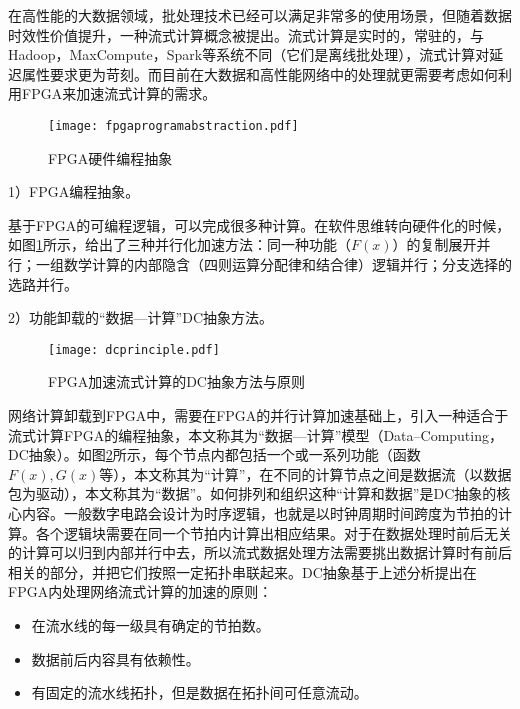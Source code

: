 
在高性能的大数据领域，批处理技术已经可以满足非常多的使用场景，但随着数据时效性价值提升，一种流式计算概念被提出。流式计算是实时的，常驻的，与Hadoop，MaxCompute，Spark等系统不同（它们是离线批处理），流式计算对延迟属性要求更为苛刻。而目前在大数据和高性能网络中的处理就更需要考虑如何利用FPGA来加速流式计算的需求。
\begin{figure}[!ht]
	\centering
	\texttt{[image: fpgaprogramabstraction.pdf]}
	\caption{FPGA硬件编程抽象} \label{fig:fpgaprogramabstraction}
\end{figure}

1）FPGA编程抽象。
		
基于FPGA的可编程逻辑，可以完成很多种计算。在软件思维转向硬件化的时候，如图\ref{fig:fpgaprogramabstraction}所示，给出了三种并行化加速方法：同一种功能（$F(x)$）的复制展开并行；一组数学计算的内部隐含（四则运算分配律和结合律）逻辑并行；分支选择的选路并行。



2）功能卸载的“数据---计算”DC抽象方法。

\begin{figure}[!ht]
	\centering
	\texttt{[image: dcprinciple.pdf]}
	\caption{FPGA加速流式计算的DC抽象方法与原则} \label{fig:dcprinciple}
\end{figure}

网络计算卸载到FPGA中，需要在FPGA的并行计算加速基础上，引入一种适合于流式计算FPGA的编程抽象，本文称其为“数据---计算”模型（Data--Computing，DC抽象）。如图\ref{fig:dcprinciple}所示，每个节点内都包括一个或一系列功能（函数$F(x), G(x)$等），本文称其为“计算”，在不同的计算节点之间是数据流（以数据包为驱动），本文称其为“数据”。如何排列和组织这种“计算和数据”是DC抽象的核心内容。一般数字电路会设计为时序逻辑，也就是以时钟周期时间跨度为节拍的计算。各个逻辑块需要在同一个节拍内计算出相应结果。对于在数据处理时前后无关的计算可以归到内部并行中去，所以流式数据处理方法需要挑出数据计算时有前后相关的部分，并把它们按照一定拓扑串联起来。DC抽象基于上述分析提出在FPGA内处理网络流式计算的加速的原则：

\begin{itemize}
	\item 在流水线的每一级具有确定的节拍数。
	\item 数据前后内容具有依赖性。%
	\item 有固定的流水线拓扑，但是数据在拓扑间可任意流动。
\end{itemize}

